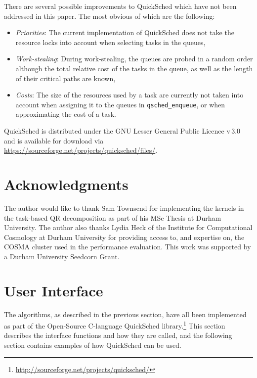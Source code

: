 \documentclass[preprint]{elsarticle}
\begin{document}
There are several possible improvements to QuickSched which
have not been addressed in this paper.
The most obvious of which are the following:
\begin{itemize}
    \item {\em Priorities}: The current implementation of
        QuickSched does not take the resource locks into
        account when selecting tasks in the queues,
    \item {\em Work-stealing}: During work-stealing, the
        queues are probed in a random order although
        the total relative cost of the tasks in the queue,
        as well as the length of their critical paths are
        known,
    \item {\em Costs}: The size of the resources used by
        a task are currently not taken into account when
        assigning it to the queues in {\tt qsched\_enqueue},
        or when approximating the cost of a task.
\end{itemize}

QuickSched is distributed under the GNU Lesser General Public Licence
v\,3.0 and is available for download via
\url{https://sourceforge.net/projects/quicksched/files/}.


\section*{Acknowledgments}
The author would like to thank Sam Townsend for implementing the
kernels in the task-based QR decomposition as part of his MSc Thesis
at Durham University.
The author also thanks Lydia Heck of the Institute for
Computational Cosmology at Durham University for providing access
to, and expertise on, the COSMA cluster used in the performance
evaluation.
This work was supported by a Durham University Seedcorn Grant.






\appendix
\section{User Interface}

The algorithms, as described in the previous section, have
all been implemented as part of the Open-Source C-language
QuickSched library.\footnote{\url{http://sourceforge.net/projects/quicksched/}}
This section describes the interface functions and how they
are called, and the following section contains
examples of how QuickSched can be used.
\end{document}

